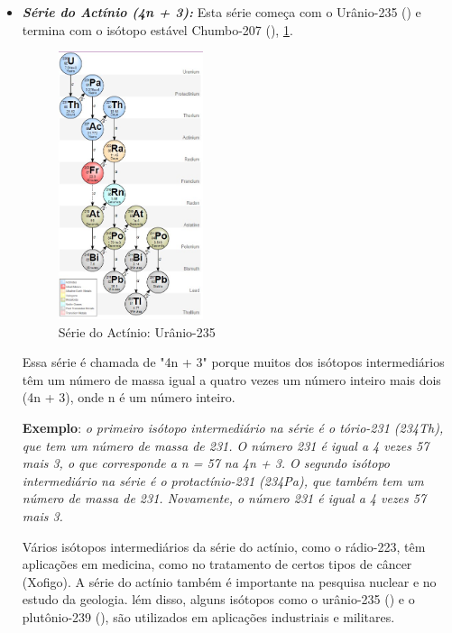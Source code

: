 \documentclass[11pt,a4paper]{article}
\begin{document}
\begin{itemize}
                    \item \textbf{\textit{\textcolor{CarnationPink}{Série do Actínio (4n + 3):}}} Esta série começa com o Urânio-235 () e termina com o isótopo estável Chumbo-207 (), \ref{fig:serieDoActinio}. 
                    
                    
                        \begin{figure}[h]
                            \centering
                            \includegraphics[width=0.4\textwidth]{Imagens/serieDoActinio.jpg}
                            \caption{Série do Actínio: Urânio-235}
                            \label{fig:serieDoActinio}
                        \end{figure}
                    
                        Essa série é chamada de "4n + 3" porque muitos dos isótopos intermediários têm um número de massa igual a quatro vezes um número inteiro mais dois (4n + 3), onde n é um número inteiro.

                        \textbf{Exemplo}: \textit{o primeiro isótopo intermediário na série é o tório-231 (234Th), que tem um número de massa de 231. O número 231 é igual a 4 vezes 57 mais 3, o que corresponde a n = 57 na  4n + 3. O segundo isótopo intermediário na série é o protactínio-231 (234Pa), que também tem um número de massa de 231. Novamente, o número 231 é igual a 4 vezes 57 mais 3.}

                        Vários isótopos intermediários da série do actínio, como o rádio-223, têm aplicações em medicina, como no tratamento de certos tipos de câncer (Xofigo). A série do actínio também é importante na pesquisa nuclear e no estudo da geologia. lém disso, alguns isótopos como o urânio-235 () e o plutônio-239 (), são utilizados em aplicações industriais e militares.

                \end{itemize}
                
\end{document}
